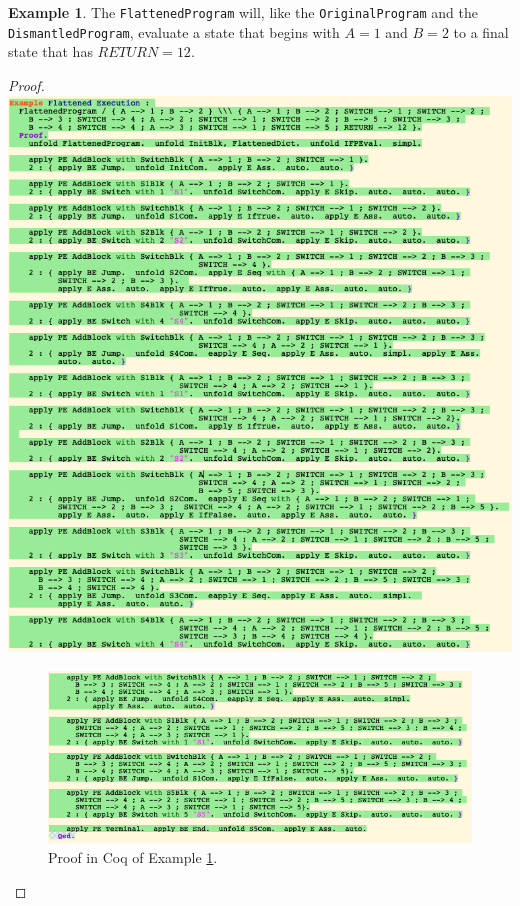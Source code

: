 \documentclass[12pt,notitlepage]{report}
\theoremstyle{plain}
\theoremstyle{definition}
\newtheorem{example}[theo]{Example}
\numberwithin{equation}{section}
\begin{document}
\begin{example}\label{while3b}
The \verb$FlattenedProgram$ will, like the \verb$OriginalProgram$ and the \verb$DismantledProgram$, evaluate a state that begins with $A=1$ and $B=2$ to a final state that has $RETURN=12$.
\begin{proof}\ \newline
    \noindent
    \includegraphics[scale=0.6]{while3a}
    \noindent
        \begin{figure}[H]
        \centering
        \includegraphics[scale=0.6]{while3b.png}
        \caption{Proof in Coq of Example \ref{while3b}.}
        \label{fig:while3b}
        \end{figure}
\end{proof}
\end{example}
\end{document}
